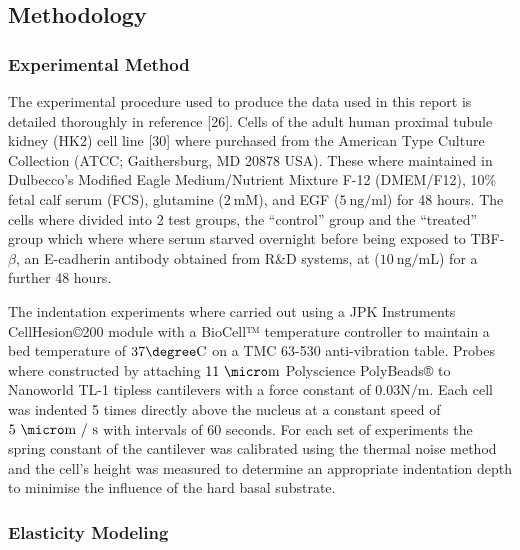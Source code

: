 \documentclass[
  paper=a4,
  ,captions=tableheading
]{scrartcl}
\begin{document}
\subsection{Methodology}\label{methodology}

\subsubsection{Experimental Method}\label{experimental-method}

The experimental procedure used to produce the data used in this report
is detailed thoroughly in reference {[}26{]}. Cells of the adult human
proximal tubule kidney (HK2) cell line {[}30{]} where purchased from the
American Type Culture Collection (ATCC; Gaithersburg, MD 20878 USA).
These where maintained in Dulbecco's Modified Eagle Medium/Nutrient
Mixture F-12 (DMEM/F12), 10\% fetal calf serum (FCS), glutamine
(\(2 \ \text{mM}\)), and EGF (\(5 \ \text{ng/ml}\)) for 48 hours. The
cells where divided into 2 test groups, the ``control'' group and the
``treated'' group which where where serum starved overnight before being
exposed to TBF-\(\beta\), an E-cadherin antibody obtained from R\&D
systems, at (\(10 \ \text{ng/mL}\)) for a further 48 hours.

The indentation experiments where carried out using a JPK Instruments
CellHesion©200 module with a BioCell™ temperature controller to maintain
a bed temperature of \(37 \degree \text{C}\) on a TMC 63-530
anti-vibration table. Probes where constructed by attaching
\(11\ \micro \text{m}\) Polyscience PolyBeads® to Nanoworld TL-1 tipless
cantilevers with a force constant of \(0.03 \text{N/m}\). Each cell was
indented 5 times directly above the nucleus at a constant speed of
\(5\ \micro \text{m / s}\) with intervals of 60 seconds. For each set of
experiments the spring constant of the cantilever was calibrated using
the thermal noise method and the cell's height was measured to determine
an appropriate indentation depth to minimise the influence of the hard
basal substrate.

\subsubsection{Elasticity Modeling}\label{elasticity-modeling}
\end{document}
